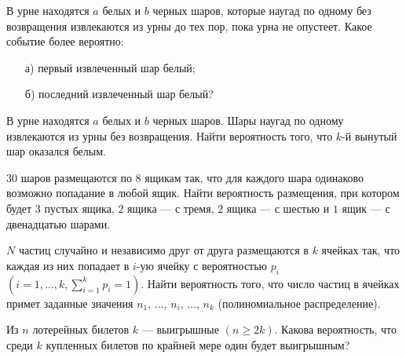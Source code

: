\begin{problem}
В урне находятся $a$ белых и $b$ черных шаров, которые наугад по одному без возвращения извлекаются из урны до тех пор, пока урна не опустеет. 
Какое событие более вероятно: 
\begin{enumerate}
\item[а)] первый извлеченный шар белый; 
\item[б)] последний извлеченный шар белый? 
\end{enumerate}
\end{problem}



\begin{problem}
В урне находятся $a$ белых и $b$ черных шаров. Шары наугад по одному извлекаются из урны без возвращения. Найти вероятность того, 
что $k$-й вынутый шар оказался белым. 
\end{problem}


\begin{problem}
$30$ шаров размещаются по $8$ ящикам так, что для каждого шара одинаково возможно попадание в любой ящик. Найти вероятность 
размещения, при котором будет $3$ пустых ящика, $2$ ящика --- с тремя, $2$ ящика --- с шестью и $1$ ящик --- с двенадцатью шарами. 
\end{problem}


\begin{problem}
$N$ частиц случайно и независимо друг от друга размещаются в $k$ ячейках так, что каждая из них попадает 
в $i$-ую ячейку с вероятностью $p_i$ $(i=1,\ldots,k, \sum\limits_{i=1}^{k} p_i=1)$. Найти вероятность того, что число частиц в ячейках 
примет заданные значения $n_1$, $\ldots$, $n_i$, $\ldots$, $n_k$ (полиномиальное распределение). 
\end{problem}

\begin{problem}
Из $n$ лотерейных билетов $k$ --- выигрышные $(n\geqslant 2k)$. Какова вероятность, что среди $k$ купленных билетов по крайней мере 
один будет выигрышным? 
\end{problem}

\begin{comment}
\begin{problem}
Из совокупности всех подмножеств множества $\{1,2,\ldots,N\}$ по схеме выбора с возвращением выбираются множества $A$ и $B$. 
Найти вероятность, что $A$ и $B$ не пересекаются. 
\end{problem}
\end{comment}





